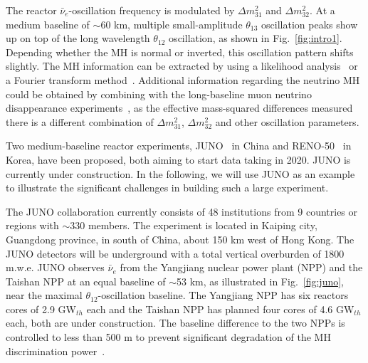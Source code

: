 \documentclass[aps,twocolumn,preprintnumbers,amsmath,superscriptaddress,amssymb,floats,nofootinbib]{revtex4-1}
\begin{document}
The reactor $\bar\nu_e$-oscillation frequency is modulated by $\Delta m^2_{31}$ and $\Delta m^2_{32}$. 
At a medium baseline of $\sim$60 km, multiple small-amplitude $\theta_{13}$ oscillation peaks show up on top of the long wavelength $\theta_{12}$ oscillation, as shown in Fig.~\ref{fig:intro1}.
Depending whether the MH is normal or inverted, this oscillation pattern shifts slightly.
The MH information can be extracted by using a likelihood analysis~\cite{Li-PRD13} or a Fourier transform method~\cite{Zhan-PRD08,Zhan-PRD09}. 
Additional information regarding the neutrino MH could be obtained by combining with the long-baseline muon neutrino disappearance experiments~\cite{Minakata}, as the effective mass-squared differences measured there is a different combination of $\Delta m^2_{31}$, $\Delta m^2_{32}$ and other oscillation parameters.

Two medium-baseline reactor experiments, JUNO~\cite{He-NuFact13} in China and RENO-50~\cite{RENO-50} in Korea, have been proposed, both aiming to start data taking in 2020. JUNO is currently under construction. In the following, we will use JUNO as an example to illustrate the significant challenges in building such a large experiment. 

The JUNO collaboration currently consists of 48 institutions from 9 countries or regions with $\sim$330 members.
The experiment is located in Kaiping city, Guangdong province, in south of China, about 150 km west of Hong Kong. The JUNO detectors will be underground with a total vertical overburden of 1800 m.w.e. JUNO observes $\bar\nu_e$ from the Yangjiang nuclear power plant (NPP) and the Taishan NPP at an equal baseline of $\sim$53 km, as illustrated in Fig.~\ref{fig:juno}, near the maximal $\theta_{12}$-oscillation baseline. The Yangjiang NPP has six reactors cores of 2.9 GW$_{th}$ each and the Taishan NPP has planned four cores of 4.6 GW$_{th}$ each, both are under construction. The baseline difference to the two NPPs is controlled to less than 500 m to prevent significant degradation of the MH discrimination power~\cite{Li-PRD13}.
\end{document}
